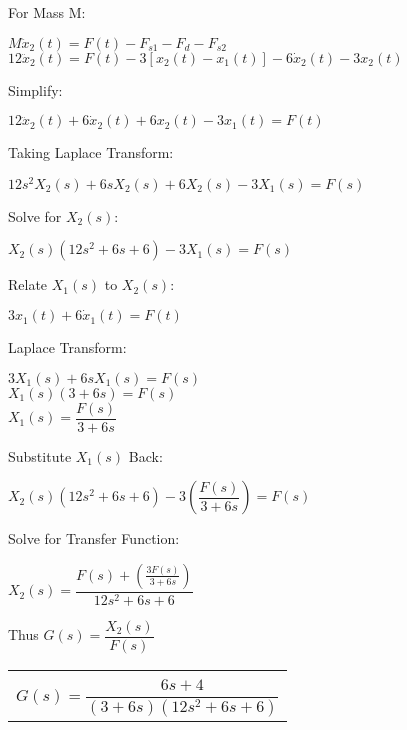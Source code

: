 \documentclass[11pt,letterpaper]{article}
\begin{document}
\vspace{12pt}

For Mass M:\\
\begin{center}
	$M\ddot{x}_2(t)=F(t)-F_{s1}-F_d-F_{s2}$\\[12pt]
	$12\ddot{x}_2(t)=F(t)-3[x_2(t)-x_1(t)]-6\dot{x}_2(t)-3x_2(t)$\\
\end{center}
Simplify:\\
\begin{center}
	$12\ddot{x}_2(t)+6\dot{x}_2(t)+6x_2(t)-3x_1(t)=F(t)$\\
\end{center}
Taking Laplace Transform:\\
\begin{center}
	$12s^2X_2(s)+6sX_2(s)+6X_2(s)-3X_1(s)=F(s)$\\
\end{center}
Solve for $X_2(s)$:\\
\begin{center}
	$X_2(s)(12s^2+6s+6)-3X_1(s)=F(s)$
\end{center}
Relate $X_1(s)$ to $X_2(s)$:\\
\begin{center}
	$3x_1(t)+6\dot{x}_1(t)=F(t)$\\
\end{center}
Laplace Transform:\\
\begin{center}
	$3X_1(s)+6sX_1(s)=F(s)$\\[12pt]
	$X_1(s)(3+6s)=F(s)$\\[12pt]
	$X_1(s)=\dfrac{F(s)}{3+6s}$\\
\end{center}
Substitute $X_1(s)$ Back:\\
\begin{center}
	$X_2(s)(12s^2+6s+6)-3\left(\dfrac{F(s)}{3+6s}\right)=F(s)$\\
\end{center}
Solve for Transfer Function:\\
\begin{center}
	$X_2(s)=\dfrac{F(s)+\left(\frac{3F(s)}{3+6s}\right)}{12s^2+6s+6}$\\[12pt]
\end{center}
Thus $G(s)=\dfrac{X_2(s)}{F(s)}$\\
\begin{center}
	\begin{tabular}{|c|}
		\hline \\
		$G(s)=\dfrac{6s+4}{(3+6s)(12s^2+6s+6)}$\\[12pt]
		\hline
	\end{tabular}	
\end{center}
\end{document}
